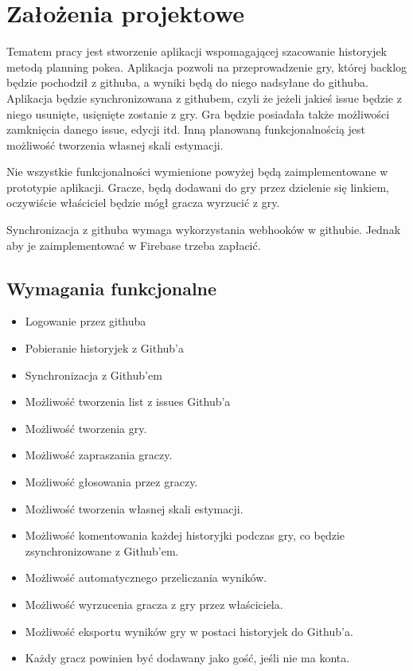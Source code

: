 \chapter{Założenia projektowe}

Tematem pracy jest stworzenie aplikacji wspomagającej szacowanie historyjek metodą planning pokea.
Aplikacja pozwoli na przeprowadzenie gry, której backlog będzie pochodził z githuba,
 a wyniki będą do niego nadsyłane do githuba.
 Aplikacja będzie synchronizowana z githubem,
czyli że jeżeli jakieś issue będzie z niego usunięte, usięnięte zostanie z gry.
Gra będzie posiadała także możliwości zamknięcia danego issue, edycji itd.
Inną planowaną funkcjonalnością jest możliwość tworzenia własnej skali estymacji.

Nie wszystkie funkcjonalności wymienione powyżej będą zaimplementowane w prototypie aplikacji.
Gracze, będą dodawani do gry przez dzielenie się linkiem,
 oczywiście właściciel będzie mógł gracza wyrzucić z gry.

 Synchronizacja z githuba wymaga wykorzystania webhooków w githubie.
 Jednak aby je zaimplementować w Firebase trzeba zapłacić.

 \section{Wymagania funkcjonalne}

 \begin{itemize}
    \item Logowanie przez githuba
    \item Pobieranie historyjek z Github'a
    \item Synchronizacja z Github'em
    \item Możliwość tworzenia list z issues Github'a
    \item Możliwość tworzenia gry.
    \item Możliwość zapraszania graczy.
    \item Możliwość głosowania przez graczy.
    \item Możliwość tworzenia własnej skali estymacji.
    \item Możliwość komentowania każdej historyjki podczas gry,
    co będzie zsynchronizowane z Github'em.
    \item Możliwość automatycznego przeliczania wyników.
    \item Możliwość wyrzucenia gracza z gry przez właściciela.
    \item Możliwość eksportu wyników gry w postaci historyjek do Github'a.
    \item Każdy gracz powinien być dodawany jako gość, jeśli nie ma konta.
\end{itemize}

